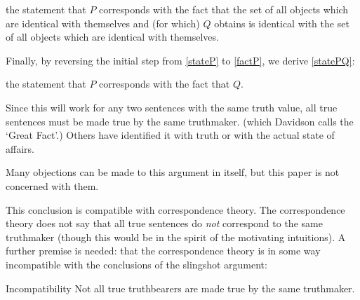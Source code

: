

	\begin{example} \label{factQ}
	the statement that $P$ corresponds with the fact that the set of all objects which are identical with themselves and (for which) $Q$ obtains is identical with the set of all objects which are identical with themselves.
	\end{example}

Finally, by reversing the initial step from \ref{stateP} to \ref{factP}, we derive \ref{statePQ}:

	\begin{example} \label{statePQ}
	the statement that $P$ corresponds with the fact that $Q$.
	\end{example}

Since this will work for any two sentences with the same truth value, all true sentences must be made true by the same truthmaker. (which Davidson calls the `Great Fact'.)
\parencite[753]{Davidson_1969}
Others have identified it with truth \parencite[216]{Frege_1948} or with the actual state of affairs. 

Many objections can be made to this argument in itself, but this paper is not concerned with them.

This conclusion is compatible with correspondence theory.
The correspondence theory does not say that all true sentences do \emph{not} correspond to the same truthmaker (though this would be in the spirit of the motivating intuitions).
A further premise is needed: that the correspondence theory is in some way incompatible with the conclusions of the slingshot argument:

	\begin{principle}{Incompatibility}\label{incompatible}
	Not all true truthbearers are made true by the same truthmaker.
	\end{principle}

